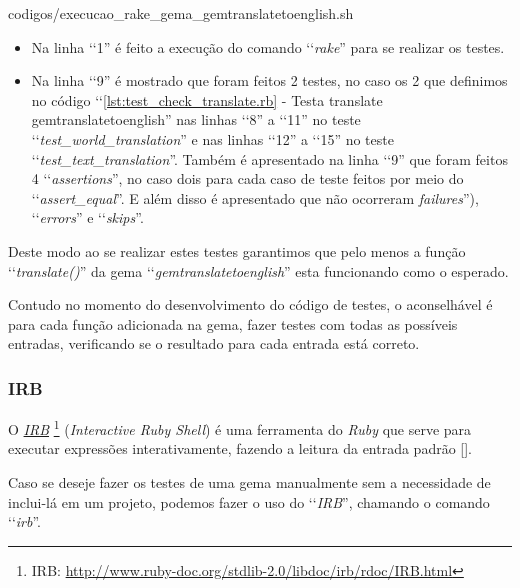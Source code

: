 
{codigos/execucao_rake_gema_gemtranslatetoenglish.sh }

\begin{itemize}

 \item Na linha ‘‘1'' é feito a execução do comando ‘‘\emph{rake}'' para se realizar os testes.
 
 \item Na linha ‘‘9'' é mostrado que foram feitos 2 testes, no caso os 2 que definimos no código 
 ‘‘\ref{lst:test_check_translate.rb} - Testa translate gemtranslatetoenglish'' nas linhas 
 ‘‘8'' a ‘‘11'' no teste ‘‘\emph{test\_world\_translation}'' e nas linhas ‘‘12'' a ‘‘15'' no teste 
 ‘‘\emph{test\_text\_translation}''. Também é apresentado na linha ‘‘9'' que foram feitos 4 
 ‘‘\emph{assertions}'', no caso dois para cada caso de teste feitos por meio do ‘‘\emph{assert\_equal}''.
 E além disso é apresentado que não ocorreram  \emph{failures}''), ‘‘\emph{errors}'' e ‘‘\emph{skips}''.
 
\end{itemize}

Deste modo ao se realizar estes testes garantimos que pelo menos a função ‘‘\emph{translate()}'' da gema
‘‘\emph{gemtranslatetoenglish}'' esta funcionando como o esperado.

Contudo no momento do desenvolvimento do código de testes, o aconselhável é para cada função adicionada 
na gema, fazer testes com todas as possíveis entradas, verificando se o resultado para cada entrada 
está correto.

\subsubsection{IRB}
\label{subsubsection:irb}

O \emph{\href{http://www.ruby-doc.org/stdlib-2.0/libdoc/irb/rdoc/IRB.html}{IRB}} 
\footnote{IRB: \url{http://www.ruby-doc.org/stdlib-2.0/libdoc/irb/rdoc/IRB.html}}
(\emph{Interactive Ruby Shell}) é uma ferramenta do \emph{Ruby} que serve para executar expressões
interativamente, fazendo a leitura da entrada padrão [].

Caso se deseje fazer os testes de uma gema manualmente sem a necessidade de inclui-lá em um projeto, podemos
fazer o uso do ‘‘\emph{IRB}'', chamando o comando ‘‘\emph{irb}''.

